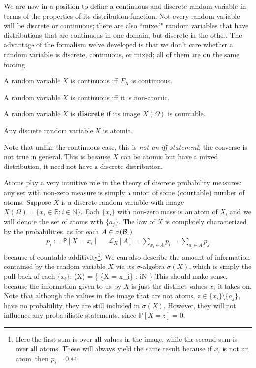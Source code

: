 We are now in a position to define a continuous and discrete random variable in terms of the properties of its distribution function. Not every random variable will be discrete or continuous; there are also ``mixed" random variables that have distributions that are continuous in one domain, but discrete in the other. The advantage of the formalism we've developed is that we don't care whether a random variable is discrete, continuous, or mixed; all of them are on the same footing. 

\begin{definition}
	A random variable $X$ is continuous iff $F_X$ is continuous.
\end{definition}

\begin{corollary}
	A random variable $X$ is continuous iff it is non-atomic. 
\end{corollary}

\begin{definition}
	A random variable $X$ is \textbf{discrete} if its image $X(\Omega)$ is countable. 
\end{definition}

\begin{corollary}
	Any discrete random variable $X$ is atomic.
\end{corollary}
Note that unlike the continuous case, this is \textit{not an iff statement}; the converse is not true in general. This is because $X$ can be atomic but have a mixed distribution, it need not have a discrete distribution. 

Atoms play a very intuitive role in the theory of discrete probability measures: any set with non-zero measure is simply a union of some (countable) number of atoms. Suppose $X$ is a discrete random variable with image $X(\Omega) = \{x_i \in\mathbb R : i\in\mathbb N\}$. Each $\{x_i\}$ with non-zero mass is an atom of $X$, and we will denote the set of atoms with $\{a_j\}$. The law of $X$ is completely characterized by the probabilities, as for each $A\in\sigma(\mathcal{B}_{1})$
\begin{align}
	p_i := \mathbb P[X = x_i] && \mathcal L_X[A] = \sum_{x_i\in A} p_i = \sum_{a_j\in A} p_j
\end{align}
because of countable additivity\footnote{Here the first sum is over all values in the image, while the second sum is over all atoms. These will always yield the same result because if $x_i$ is not an atom, then $p_i = 0$.}. We can also describe the amount of information contained by the random variable $X$ via its $\sigma$-algebra $\sigma(X)$, which is simply the pull-back of each $\{x_i\}$:
\eq
	\sigma(X) = \left\{ \{X = x_i\} : i\in\mathbb N \right\}
	\label{eq:discrete_rv_sigma_X}
\qe
This should make sense, because the information given to us by $X$ is just the distinct values $x_i$ it takes on. Note that although the values in the image that are not atoms, $z\in \{x_i\}\setminus \{a_j\}$, have no probability, they are still included in $\sigma(X)$. However, they will not influence any probabilistic statements, since $\mathbb P[X = z] = 0$. 

